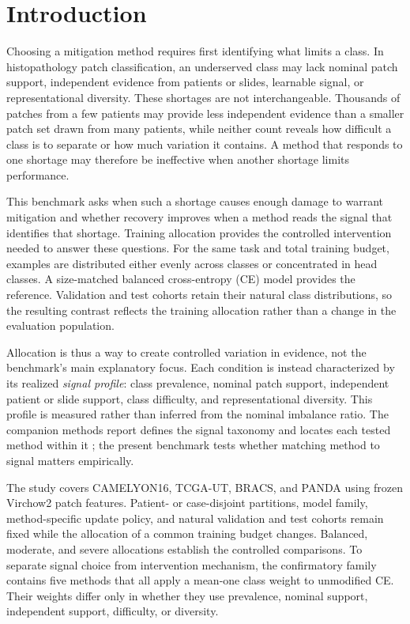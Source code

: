 \documentclass[11pt]{article}
\begin{document}
\setcounter{tocdepth}{2}
\tableofcontents
\clearpage

\section{Introduction}
Choosing a mitigation method requires first identifying what limits a class. In histopathology patch classification, an underserved class may lack nominal patch support, independent evidence from patients or slides, learnable signal, or representational diversity. These shortages are not interchangeable. Thousands of patches from a few patients may provide less independent evidence than a smaller patch set drawn from many patients, while neither count reveals how difficult a class is to separate or how much variation it contains. A method that responds to one shortage may therefore be ineffective when another shortage limits performance.

This benchmark asks when such a shortage causes enough damage to warrant mitigation and whether recovery improves when a method reads the signal that identifies that shortage. Training allocation provides the controlled intervention needed to answer these questions. For the same task and total training budget, examples are distributed either evenly across classes or concentrated in head classes. A size-matched balanced cross-entropy (CE) model provides the reference. Validation and test cohorts retain their natural class distributions, so the resulting contrast reflects the training allocation rather than a change in the evaluation population.

Allocation is thus a way to create controlled variation in evidence, not the benchmark's main explanatory focus. Each condition is instead characterized by its realized \emph{signal profile}: class prevalence, nominal patch support, independent patient or slide support, class difficulty, and representational diversity. This profile is measured rather than inferred from the nominal imbalance ratio. The companion methods report defines the signal taxonomy and locates each tested method within it \citep{queisler2026imbalanceMethods}; the present benchmark tests whether matching method to signal matters empirically.

The study covers CAMELYON16, TCGA-UT, BRACS, and PANDA using frozen Virchow2 patch features. Patient- or case-disjoint partitions, model family, method-specific update policy, and natural validation and test cohorts remain fixed while the allocation of a common training budget changes. Balanced, moderate, and severe allocations establish the controlled comparisons. To separate signal choice from intervention mechanism, the confirmatory family contains five methods that all apply a mean-one class weight to unmodified CE. Their weights differ only in whether they use prevalence, nominal support, independent support, difficulty, or diversity.
\end{document}
